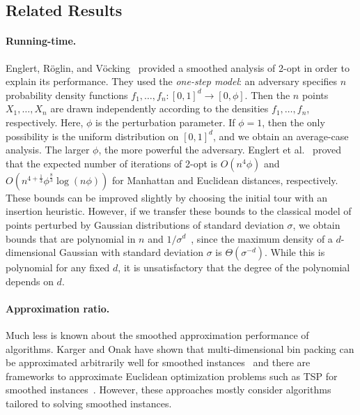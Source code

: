 \documentclass[11pt,DIV=12,a4paper]{scrartcl}
\begin{document}
\subsection{Related Results}

\paragraph{Running-time.}
Englert, R\"oglin, and V\"ocking~\cite{EnglertEA:2Opt:2014} provided a smoothed analysis of 2-opt in order to explain its performance.
They used the \emph{one-step model}:
an adversary specifies $n$ probability density functions $f_1, \ldots, f_n: [0,1]^d \to [0,\phi]$. Then the $n$ points $X_1, \ldots, X_n$
are drawn independently according to the densities $f_1, \ldots, f_n$, respectively. Here, $\phi$ is the perturbation parameter.
If $\phi =1$, then the only possibility is the uniform distribution on $[0,1]^d$, and we obtain an
average-case analysis.
The larger $\phi$, the more powerful the adversary.
Englert et al.~\cite{EnglertEA:2Opt:2014} proved that the expected number of iterations of 2-opt is
$O(n^{4}  \phi)$ and
$O(n^{4+\frac 13}  \phi^{\frac 83}  \log(n\phi))$ for Manhattan and
Euclidean distances, respectively.
These bounds can be improved slightly by choosing the initial tour with an insertion heuristic.
However, if we transfer these bounds to the classical model of
points perturbed by Gaussian distributions of standard deviation $\sigma$,
we obtain bounds that are polynomial in $n$ and $1/\sigma^d$~\cite[Section 6]{EnglertEA:2Opt:2014},
since the maximum density of a $d$-dimensional Gaussian with standard deviation
$\sigma$ is $\Theta(\sigma^{-d})$. While this is polynomial for any fixed $d$, it
is unsatisfactory that the degree of the polynomial depends on $d$.

\paragraph{Approximation ratio.}

Much less is known about the smoothed approximation performance of algorithms.
Karger and Onak have shown that multi-dimensional bin packing can be approximated arbitrarily well for smoothed instances~\cite{KargerOnak:SmoothedPacking:2007} and there are frameworks to approximate Euclidean optimization problems such as TSP for smoothed
instances~\cite{BlaeserEA:Partitioning:2013,CurticapeanK15}. However, these approaches mostly consider algorithms tailored to solving smoothed instances. 
\end{document}
